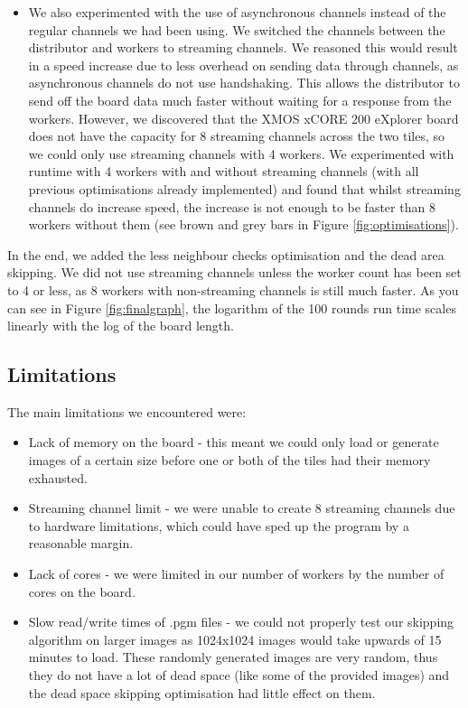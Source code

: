 \documentclass[]{article}
\begin{document}
\begin{itemize}
	\item We also experimented with the use of asynchronous channels instead of the regular channels we had been using. We switched the channels between the distributor and workers to streaming channels. We reasoned this would result in a speed increase due to less overhead on sending data through channels, as asynchronous channels do not use handshaking. This allows the distributor to send off the board data much faster without waiting for a response from the workers. However, we discovered that the XMOS xCORE 200 eXplorer board does not have the capacity for 8 streaming channels across the two tiles, so we could only use streaming channels with 4 workers. We experimented with runtime with 4 workers with and without streaming channels (with all previous optimisations already implemented) and found that whilst streaming channels do increase speed, the increase is not enough to be faster than 8 workers without them (see brown and grey bars in Figure \ref{fig:optimisations}).
\end{itemize}
In the end, we added the less neighbour checks optimisation and the dead area skipping. We did not use streaming channels unless the worker count has been set to 4 or less, as 8 workers with non-streaming channels is still much faster. As you can see in Figure \ref{fig:finalgraph}, the logarithm of the 100 rounds run time scales linearly with the log of the board length.


\subsection{Limitations}
The main limitations we encountered were:
\begin{itemize}
	\item Lack of memory on the board - this meant we could only load or generate images of a certain size before one or both of the tiles had their memory exhausted.
	\item Streaming channel limit - we were unable to create 8 streaming channels due to hardware limitations, which could have sped up the program by a reasonable margin.
	\item Lack of cores - we were limited in our number of workers by the number of cores on the board.
	\item Slow read/write times of .pgm files - we could not properly test our skipping algorithm on larger images as 1024x1024 images would take upwards of 15 minutes to load. These randomly generated images are very random, thus they do not have a lot of dead space (like some of the provided images) and the dead space skipping optimisation had little effect on them.
\end{itemize}
\clearpage
\end{document}
